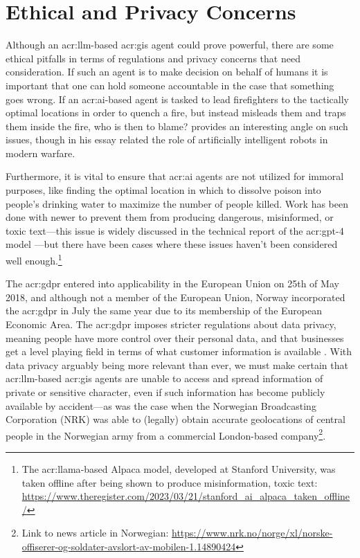 \section{Ethical and Privacy Concerns}\label{sec:ethical-and-privacy-concerns}

Although an \acrshort{acr:llm}-based \acrshort{acr:gis} agent could prove powerful, there are some ethical pitfalls in terms of regulations and privacy concerns that need consideration. If such an agent is to make decision on behalf of humans it is important that one can hold someone accountable in the case that something goes wrong. If an \acrshort{acr:ai}-based agent is tasked to lead firefighters to the tactically optimal locations in order to quench a fire, but  instead misleads them and traps them inside the fire, who is then to blame? \cite{sparrowKillerRobots2007} provides an interesting angle on such issues, though in his essay related the role of artificially intelligent robots in modern warfare.

Furthermore, it is vital to ensure that \acrshort{acr:ai} agents are not utilized for immoral purposes, like finding the optimal location in which to dissolve poison into people's drinking water to maximize the number of people killed. Work has been done with newer  to prevent them from producing dangerous, misinformed, or toxic text---this issue is widely discussed in the technical report of the \acrshort{acr:gpt}-4 model \citep[11-14]{openaiGPT4TechnicalReport2023}---but there have been cases where these issues haven't been considered well enough.\footnote{The \acrshort{acr:llama}-based Alpaca model, developed at Stanford University, was taken offline after being shown to produce misinformation, toxic text: \url{https://www.theregister.com/2023/03/21/stanford_ai_alpaca_taken_offline/}}

The \gls{acr:gdpr} entered into applicability in the European Union on 25th of May 2018, and although not a member of the European Union, Norway incorporated the \gls{acr:gdpr} in July the same year due to its membership of the European Economic Area. The \gls{acr:gdpr} imposes stricter regulations about data privacy, meaning people have more control over their personal data, and that businesses get a level playing field in terms of what customer information is available \citep{datatilsynetGeneralDataProtection}. With data privacy arguably being more relevant than ever, we must make certain that \acrshort{acr:llm}-based \acrshort{acr:gis} agents are unable to access and spread information of private or sensitive character, even if such information has become publicly available by accident---as was the case when the Norwegian Broadcasting Corporation (NRK) was able to (legally) obtain accurate geolocations of central people in the Norwegian army from a commercial London-based company\footnote{Link to news article in Norwegian: \url{https://www.nrk.no/norge/xl/norske-offiserer-og-soldater-avslort-av-mobilen-1.14890424}}.

\glsresetall